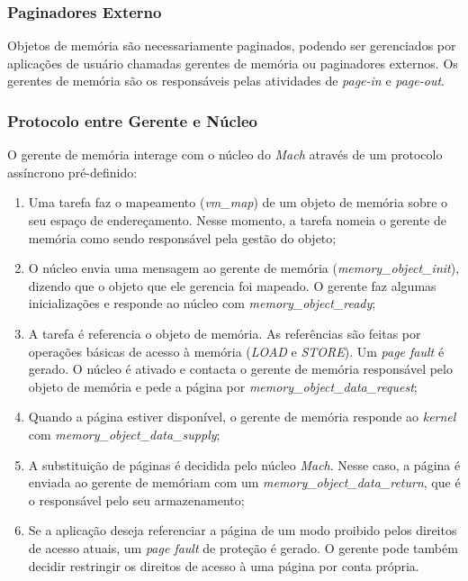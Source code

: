 \subsubsection{Paginadores Externo}
Objetos de memória são necessariamente paginados, podendo ser gerenciados por aplicações de usuário chamadas gerentes de memória ou paginadores externos. Os gerentes de memória são os responsáveis pelas atividades de \textit{page-in} e \textit{page-out}.


\subsubsection{Protocolo entre Gerente e Núcleo}
O gerente de memória interage com o núcleo do \textit{Mach} através de um protocolo assíncrono pré-definido:

\begin{enumerate}
  \item Uma tarefa faz o mapeamento (\textit{vm_map}) de um objeto de memória sobre o seu espaço de endereçamento. Nesse momento, a tarefa nomeia o gerente de memória como sendo responsável pela gestão do objeto;

  \item O núcleo envia uma mensagem ao gerente de memória (\textit{memory_object_init}), dizendo que o objeto que ele gerencia foi mapeado. O gerente faz algumas inicializações e responde ao núcleo com \textit{memory_object_ready};

  \item A tarefa é referencia o objeto de memória. As referências são feitas por operações básicas de acesso à memória (\textit{LOAD} e \textit{STORE}). Um \textit{page fault} é gerado. O núcleo é ativado e contacta o gerente de memória responsável pelo objeto de memória e pede a página por \textit{memory_object_data_request};

  \item Quando a página estiver disponível, o gerente de memória responde ao \textit{kernel} com \textit{memory_object_data_supply};

  \item A substituição de páginas é decidida pelo núcleo \textit{Mach}. Nesse caso, a página é enviada ao gerente de memóriam com um \textit{memory_object_data_return}, que é o responsável pelo seu armazenamento;

  \item Se a aplicação deseja referenciar a página de um modo proibido pelos direitos de acesso atuais, um \textit{page fault} de proteção é gerado. O gerente pode também decidir restringir os direitos de acesso à uma página por conta própria.
\end{enumerate}

